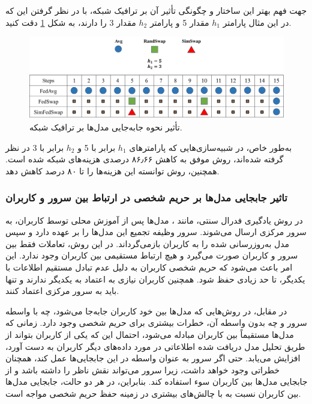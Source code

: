 جهت فهم بهتر این ساختار و چگونگی تأثیر آن بر ترافیک شبکه، با در نظر گرفتن این که در این مثال پارامتر \(h_1\) مقدار 5 و پارامتر \(h_2\) مقدار 3 را دارند، به شکل
\ref{compare_swap_net_traffic} 
دقت کنید.
\begin{figure}[t]
	\centering
	\includegraphics[scale=0.3]{images/chap4/compare_swap_net_traffic.png}%
	\caption{%
		تأثیر نحوه جابه‌جایی مدل‌ها بر ترافیک شبکه.
	}
	\label{compare_swap_net_traffic}
	\centering
\end{figure}
به‌طور خاص، در شبیه‌سازی‌هایی که پارامترهای \(h_1\) برابر با 5 و \(h_2\) برابر با 3 در نظر گرفته شده‌اند، روش  موفق به کاهش
۸۶٫۶۶
درصدی هزینه‌های شبکه شده است. همچنین، روش  توانسته این هزینه‌ها را تا ۸۰ درصد کاهش دهد. 


\subsubsection{
	تاثیر جابجایی مدل‌ها بر حریم شخصی در ارتباط بین سرور و کاربران
}
در روش یادگیری فدرال سنتی، مانند
%
، مدل‌ها پس از آموزش محلی توسط کاربران، به سرور مرکزی ارسال می‌شوند. سرور وظیفه تجمیع این مدل‌ها را بر عهده دارد و سپس مدل به‌روزرسانی‌ شده را به کاربران بازمی‌گرداند. در این روش، تعاملات فقط بین سرور و کاربران صورت می‌گیرد و هیچ ارتباط مستقیمی بین کاربران وجود ندارد. این امر باعث می‌شود که حریم شخصی کاربران به دلیل عدم تبادل مستقیم اطلاعات با یکدیگر، تا حد زیادی حفظ شود. همچنین کاربران نیازی به اعتماد به یکدیگر ندارند و تنها باید به سرور مرکزی اعتماد کنند.

در مقابل، در روش‌هایی که مدل‌ها بین خود کاربران جابه‌جا می‌شود، چه با واسطه سرور و چه بدون واسطه آن، خطرات بیشتری برای حریم شخصی وجود دارد. زمانی که مدل‌ها مستقیماً بین کاربران مبادله می‌شود، احتمال این که یکی از کاربران بتواند از طریق تحلیل مدل دریافت ‌شده اطلاعاتی در مورد داده‌های دیگر کاربران به دست آورد، افزایش می‌یابد. حتی اگر سرور به عنوان واسطه در این جابجایی‌ها عمل کند، همچنان خطراتی وجود خواهد داشت، زیرا سرور می‌تواند نقش ناظر را داشته باشد و از جابجایی مدل‌ها بین کاربران سوء استفاده کند. بنابراین، در هر دو حالت، جابجایی مدل‌ها بین کاربران نسبت به
با چالش‌های بیشتری در زمینه حفظ حریم شخصی مواجه است.

